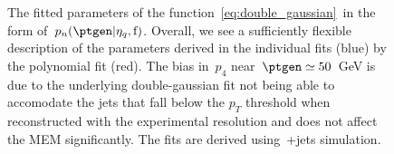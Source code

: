 \begin{figure}
\begin{centering}
 \\
 \\
\caption{The fitted parameters of the function~\cref{eq:double_gaussian}~in the form of~$p_n(\ptgen|\eta_{q},\mathrm{f})$. Overall, we see a sufficiently flexible description of the parameters derived in the individual fits (blue) by the polynomial fit (red). The bias in~$p_4$ near~$\ptgen \simeq 50$~GeV is due to the underlying double-gaussian fit not being able to accomodate the jets that fall below the $p_T$ threshold when reconstructed with the experimental resolution and does not affect the MEM significantly. The fits are derived using~\ttbar+jets simulation.}
\label{fig:transfer_acrossbin}
\end{centering}
\end{figure}


